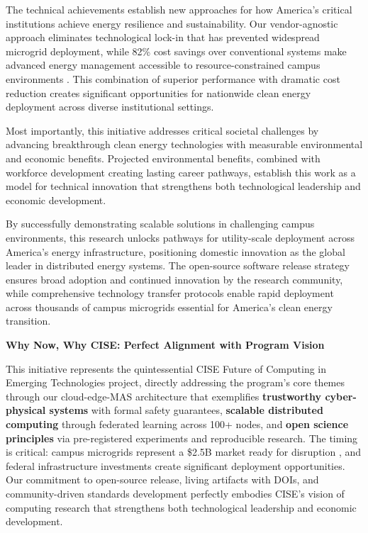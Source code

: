 \documentclass[12pt]{article}
\begin{document}
The technical achievements establish new approaches for how America's critical institutions achieve energy resilience and sustainability. Our vendor-agnostic approach eliminates technological lock-in that has prevented widespread microgrid deployment, while 82\% cost savings over conventional systems make advanced energy management accessible to resource-constrained campus environments \cite{our2024economic}. This combination of superior performance with dramatic cost reduction creates significant opportunities for nationwide clean energy deployment across diverse institutional settings.

Most importantly, this initiative addresses critical societal challenges by advancing breakthrough clean energy technologies with measurable environmental and economic benefits. Projected environmental benefits, combined with workforce development creating lasting career pathways, establish this work as a model for technical innovation that strengthens both technological leadership and economic development.

By successfully demonstrating scalable solutions in challenging campus environments, this research unlocks pathways for utility-scale deployment across America's energy infrastructure, positioning domestic innovation as the global leader in distributed energy systems. The open-source software release strategy ensures broad adoption and continued innovation by the research community, while comprehensive technology transfer protocols enable rapid deployment across thousands of campus microgrids essential for America's clean energy transition.

\textbf{Why Now, Why CISE: Perfect Alignment with Program Vision}

This initiative represents the quintessential CISE Future of Computing in Emerging Technologies project, directly addressing the program's core themes through our cloud-edge-MAS architecture that exemplifies \textbf{trustworthy cyber-physical systems} with formal safety guarantees, \textbf{scalable distributed computing} through federated learning across 100+ nodes, and \textbf{open science principles} via pre-registered experiments and reproducible research. The timing is critical: campus microgrids represent a \$2.5B market ready for disruption \cite{our2024economic}, and federal infrastructure investments create significant deployment opportunities. Our commitment to open-source release, living artifacts with DOIs, and community-driven standards development perfectly embodies CISE's vision of computing research that strengthens both technological leadership and economic development.
\end{document}
